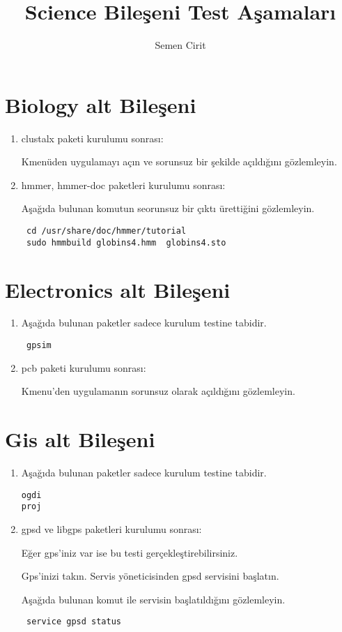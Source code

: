 \documentclass[a4paper,10pt]{article}
\title{Science Bileşeni Test Aşamaları}
\author{Semen Cirit}
\begin{document}
\maketitle
\section{Biology alt Bileşeni}
\begin{enumerate}
 \item clustalx paketi kurulumu sonrası:

Kmenüden uygulamayı açın ve sorunsuz bir şekilde açıldığını gözlemleyin.

\item hmmer, hmmer-doc paketleri kurulumu sonrası:

Aşağıda bulunan komutun seorunsuz bir çıktı ürettiğini gözlemleyin.
\begin{verbatim}
 cd /usr/share/doc/hmmer/tutorial
 sudo hmmbuild globins4.hmm  globins4.sto
\end{verbatim}

\end{enumerate}

\section{Electronics alt Bileşeni}
\begin{enumerate}
 \item Aşağıda bulunan paketler sadece kurulum testine tabidir.
\begin{verbatim}
 gpsim
\end{verbatim}
\item pcb paketi kurulumu sonrası:

Kmenu'den uygulamanın sorunsuz olarak açıldığını gözlemleyin.
\end{enumerate}


\section{Gis alt Bileşeni}
\begin{enumerate}
\item Aşağıda bulunan paketler sadece kurulum testine tabidir.
\begin{verbatim}
ogdi
proj
\end{verbatim}

 \item gpsd ve libgps paketleri kurulumu sonrası:

Eğer gps'iniz var ise bu testi gerçekleştirebilirsiniz.

Gps'inizi takın. Servis yöneticisinden gpsd servisini başlatın.

Aşağıda bulunan komut ile servisin başlatıldığını gözlemleyin.
\begin{verbatim}
 service gpsd status
\end{verbatim}


\end{enumerate}
\end{document}
